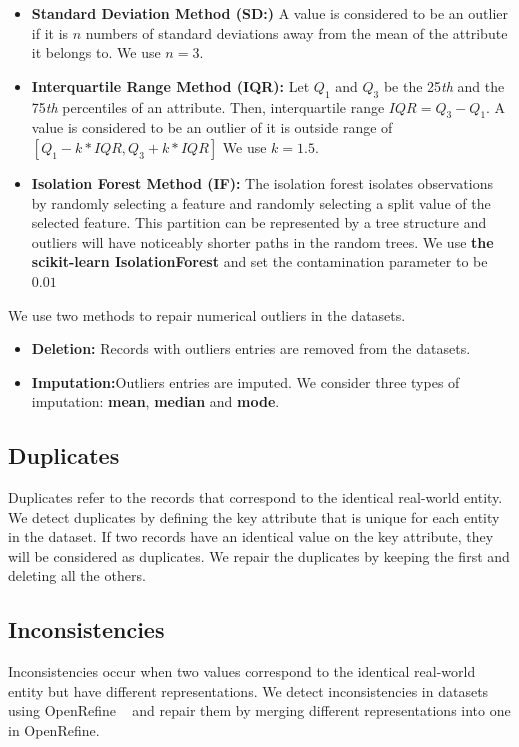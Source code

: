 \begin{itemize}
	\item {\textbf{Standard Deviation Method (SD:)}
		A value is considered to be an outlier if it is $n$ numbers of standard deviations away from the mean of the attribute it belongs to. We use $ n = 3 $.
	}
	\item {\textbf{Interquartile Range Method (IQR):} Let $Q_{1}$ and $Q_{3}$ be the 25\textit{th} and the 75\textit{th} percentiles of an attribute. Then, interquartile range 
		$ IQR = Q_{3} - Q_{1} $. A value is considered to be an outlier of it is outside range
		of $ [Q_{1} - k * IQR, Q_{3} + k * IQR] $ We use $ k = 1.5$.
	}
	\item{\textbf{Isolation Forest Method (IF):}
		The isolation forest isolates observations by randomly selecting a feature and randomly selecting a
		split value of the selected feature. This partition can be represented by a tree structure and outliers will have noticeably shorter
		paths in the random trees. We use \textbf{the scikit-learn IsolationForest}
		and set the contamination parameter to be $\mathbf{0.01}$
	}
\end{itemize}
We use two methods to repair numerical outliers in the datasets.
\begin{itemize}
	\item {
		\textbf{Deletion:} Records with outliers entries are removed from the datasets.
	}
	\item {
		\textbf{Imputation:}Outliers entries are imputed. We consider three
		types of imputation:  \textbf{mean}, \textbf{median} and \textbf{mode}.
	}
\end{itemize}

\subsection{Duplicates}
Duplicates refer to the records that correspond to the identical
real-world entity. We detect duplicates by defining the key attribute
that is unique for each entity in the dataset. If two records have an
identical value on the key attribute, they will be considered as duplicates. We repair the duplicates by keeping the first and deleting all the others.

\subsection{Inconsistencies}
Inconsistencies occur when two values correspond to the identical real-world entity but have different representations. 
We detect inconsistencies in datasets using OpenRefine ~\cite{Verborgh2013} and repair them by merging different representations into one in OpenRefine.

